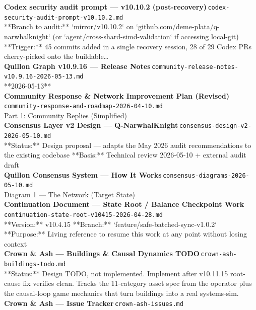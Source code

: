 \documentclass[11pt,a4paper]{article}
\begin{document}
\noindent\textbf{Codex security audit prompt --- v10.10.2 (post-recovery)}\,\textcolor{qgray}{\small \texttt{codex-security-audit-prompt-v10.10.2.md}}\\
**Branch to audit:** `mirror/v10.10.2` on `github.com/deme-plata/q-narwhalknight` (or `agent/cross-shard-simd-validation` if accessing local-git) **Trigger:** 45 commits added in a single recovery session, 28 of 29 Codex PRs cherry-picked onto the buildable\ldots{}\\[6pt]
\noindent\textbf{Quillon Graph v10.9.16 --- Release Notes}\,\textcolor{qgray}{\small \texttt{community-release-notes-v10.9.16-2026-05-13.md}}\\
**2026-05-13**\\[6pt]
\noindent\textbf{Community Response \& Network Improvement Plan (Revised)}\,\textcolor{qgray}{\small \texttt{community-response-and-roadmap-2026-04-10.md}}\\
Part 1: Community Replies (Simplified)\\[6pt]
\noindent\textbf{Consensus Layer v2 Design --- Q-NarwhalKnight}\,\textcolor{qgray}{\small \texttt{consensus-design-v2-2026-05-10.md}}\\
**Status:** Design proposal --- adapts the May 2026 audit recommendations to the existing codebase **Basis:** Technical review 2026-05-10 + external audit draft\\[6pt]
\noindent\textbf{Quillon Consensus System --- How It Works}\,\textcolor{qgray}{\small \texttt{consensus-diagrams-2026-05-10.md}}\\
Diagram 1 --- The Network (Target State)\\[6pt]
\noindent\textbf{Continuation Document --- State Root / Balance Checkpoint Work}\,\textcolor{qgray}{\small \texttt{continuation-state-root-v10415-2026-04-28.md}}\\
**Version:** v10.4.15 **Branch:** `feature/safe-batched-sync-v1.0.2` **Purpose:** Living reference to resume this work at any point without losing context\\[6pt]
\noindent\textbf{Crown \& Ash --- Buildings \& Causal Dynamics TODO}\,\textcolor{qgray}{\small \texttt{crown-ash-buildings-todo.md}}\\
**Status:** Design TODO, not implemented. Implement after v10.11.15 root-cause fix verifies clean. Tracks the 11-category asset spec from the operator plus the causal-loop game mechanics that turn buildings into a real systems-sim.\\[6pt]
\noindent\textbf{Crown \& Ash --- Issue Tracker}\,\textcolor{qgray}{\small \texttt{crown-ash-issues.md}}\\
\end{document}
